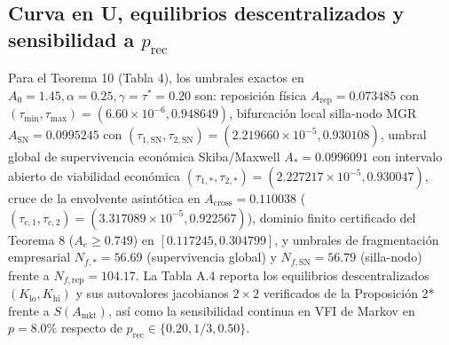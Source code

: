 \documentclass[11pt,letterpaper]{article}
\theoremstyle{plain}
\begin{document}
\subsection{Curva en U, equilibrios descentralizados y sensibilidad a \texorpdfstring{$p_{\mathrm{rec}}$}{p\_rec}}

Para el Teorema 10 (Tabla 4), los umbrales exactos en $A_0=1.45, \alpha=0.25, \gamma=\tau^*=0.20$ son: reposición física $A_{\mathrm{rep}}=0.073485$ con $(\tau_{\min},\tau_{\max})=(6.60\times 10^{-6}, 0.948649)$, bifurcación local silla-nodo MGR $A_{\mathrm{SN}}=0.0995245$ con $(\tau_{1,\mathrm{SN}},\tau_{2,\mathrm{SN}})=(2.219660\times 10^{-5}, 0.930108)$, umbral global de supervivencia económica Skiba/Maxwell $A_*=0.0996091$ con intervalo abierto de viabilidad económica $(\tau_{1,*},\tau_{2,*})=(2.227217\times 10^{-5}, 0.930047)$, cruce de la envolvente asintótica en $A_{\mathrm{cross}}=0.110038$ ($(\tau_{c,1},\tau_{c,2})=(3.317089\times 10^{-5}, 0.922567)$), dominio finito certificado del Teorema 8 ($A_e\ge 0.749$) en $[0.117245, 0.304799]$, y umbrales de fragmentación empresarial $N_{f,*}=56.69$ (supervivencia global) y $N_{f,\mathrm{SN}}=56.79$ (silla-nodo) frente a $N_{f,\mathrm{rep}}=104.17$. La Tabla A.4 reporta los equilibrios descentralizados $(K_{\mathrm{lo}}, K_{\mathrm{hi}})$ y sus autovalores jacobianos $2\times 2$ verificados de la Proposición 2* frente a $S(A_{\mathrm{mkt}})$, así como la sensibilidad continua en VFI de Markov en $p=8.0\%$ respecto de $p_{\mathrm{rec}}\in\{0.20, 1/3, 0.50\}$.
\end{document}
